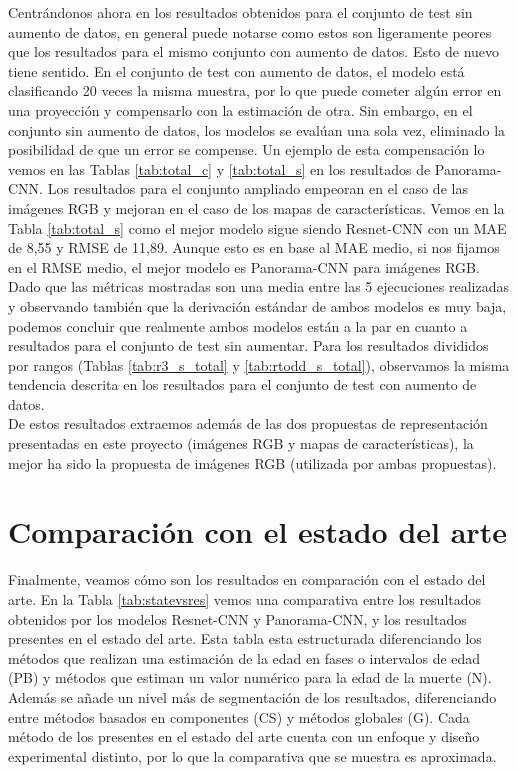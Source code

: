 Centrándonos ahora en los resultados obtenidos para el conjunto de test sin aumento de datos, en general puede notarse como estos son ligeramente peores que los resultados para el mismo conjunto con aumento de datos. Esto de nuevo tiene sentido. En el conjunto de test con aumento de datos, el modelo está clasificando 20 veces la misma muestra, por lo que puede cometer algún error en una proyección y compensarlo con la estimación de otra. Sin embargo, en el conjunto sin aumento de datos, los modelos se evalúan una sola vez, eliminado la posibilidad de que un error se compense. Un ejemplo de esta compensación lo vemos en las Tablas \ref{tab:total_c} y \ref{tab:total_s} en los resultados de Panorama-CNN. Los resultados para el conjunto ampliado empeoran en el caso de las imágenes RGB y mejoran en el caso de los mapas de características. Vemos en la Tabla \ref{tab:total_s} como el mejor modelo sigue siendo Resnet-CNN con un MAE de 8,55 y RMSE de 11,89. Aunque esto es en base al MAE medio, si nos fijamos en el RMSE medio, el mejor modelo es Panorama-CNN para imágenes RGB. Dado que las métricas mostradas son una media entre las 5 ejecuciones realizadas y observando también que la derivación estándar de ambos modelos es muy baja, podemos concluir que realmente ambos modelos están a la par en cuanto a resultados para el conjunto de test sin aumentar. Para los resultados divididos por rangos (Tablas \ref{tab:r3_s_total} y \ref{tab:rtodd_s_total}), observamos la misma tendencia descrita en los resultados para el conjunto de test con aumento de datos.\\

De estos resultados extraemos además de las dos propuestas de representación presentadas en este proyecto (imágenes RGB y mapas de características), la mejor ha sido la propuesta de imágenes RGB (utilizada por ambas propuestas).

\section{Comparación con el estado del arte}

Finalmente, veamos cómo son los resultados en comparación con el estado del arte. En la Tabla \ref{tab:statevsres} vemos una comparativa entre los resultados obtenidos por los modelos Resnet-CNN y Panorama-CNN, y los resultados presentes en el estado del arte. Esta tabla esta estructurada diferenciando los métodos que realizan una estimación de la edad en fases o intervalos de edad (PB) y métodos que estiman un valor numérico para la edad de la muerte (N). Además se añade un nivel más de segmentación de los resultados, diferenciando entre métodos basados en componentes (CS) y métodos globales (G). Cada método de los presentes en el estado del arte cuenta con un enfoque y diseño experimental distinto, por lo que la comparativa que se muestra es aproximada.

